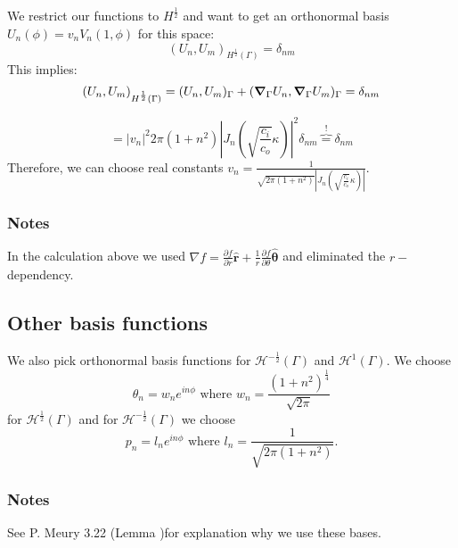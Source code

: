 \documentclass[10pt,journal,compsoc, onecolumn]{IEEEtran}
\begin{document}
We restrict our functions to $H^{\frac{1}{2}}$ and want to get an orthonormal basis $U_n(\phi) = v_n V_n(1, \phi)$ for this space: 
$$
(U_n, U_m)_{H^{\frac{1}{2}}(\Gamma)} = \delta_{nm}
$$
This implies: 
$$
(U_n, U_m)_{H^{\frac{1}{2}}(\Gamma)} = (U_n, U_m)_{\Gamma} + (\grad_\Gamma U_n, \grad_\Gamma U_m)_{\Gamma} = \delta_{nm}
$$

$$
 = |v_n|^2 2\pi(1 + n^2) |J_n(\sqrt{ \frac{c_i}{c_o}} \kappa )|^2   \delta_{nm}  \overbrace{=}^! \delta_{nm}
$$
Therefore, we can choose real constants $v_n = \frac{1}{\sqrt{2 \pi (1 + n^2)} |J_n(\sqrt{ \frac{c_i}{c_o}} \kappa  )|}$.

\subsubsection*{Notes}
In the calculation above we used \(\nabla f = \frac{\partial f}{\partial r} \hat{\mathbf{r}}+\frac{1}{r} \frac{\partial f}{\partial \theta} \hat{\boldsymbol{\theta}}\) and eliminated the $r-$ dependency.
\begin{comment}
\textit{Note (from NumPDE Advanced):} 1. The Dirichlet trace space \(H^{\frac{1}{2}}(\Gamma)\) is the Hilbert space obtained by completion of \(\left.C^{\infty}(\bar{\Omega})\right|_{\Gamma}\) with
respect to the energy norm
$$
\|\mathfrak{u}\|_{H^{\frac{1}{2}}(\Gamma)}:=\inf \left\{\|v\|_{H^{1}(\Omega)}: v \in C^{\infty}(\bar{\Omega}), T_{D} v=\mathfrak{u}\right\},\left.\quad \mathfrak{u} \in C^{\infty}(\bar{\Omega})\right|_{\Gamma}
$$. 
\end{comment}


\subsection{Other basis functions}
We also pick orthonormal basis functions for $\mathcal{H}^{-\frac{1}{2}}(\Gamma)$ and $\mathcal{H}^1(\Gamma)$.
We choose $$\theta_n =w_n e^{i n \phi}\text{ where } w_n = \frac{(1 + n^2)^{\frac{1}{4}}}{\sqrt{2 \pi}}$$ for $\mathcal{H}^{\frac{1}{2}}(\Gamma)$ and for $\mathcal{H}^{-\frac{1}{2}}(\Gamma)$ we choose  $$p_n = l_n e^{i n \phi} \text{ where } l_n = \frac{1}{\sqrt{2 \pi (1+n^2)}}. $$



\subsubsection*{Notes}
See P. Meury 3.22 (Lemma )for explanation why we use these bases.
\end{document}
